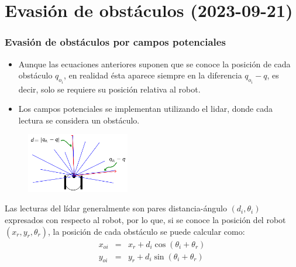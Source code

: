 
\section{Evasión de obstáculos (2023-09-21)}

\begin{frame}\frametitle{Evasión de obstáculos por campos potenciales}
  \begin{itemize}
  \item Aunque las ecuaciones anteriores suponen que se conoce la posición de cada obstáculo $q_{o_i}$, en realidad ésta aparece siempre en la diferencia $q_{o_i} - q$, es decir, solo se requiere su posición relativa al robot.
  \item Los campos potenciales se implementan utilizando el lidar, donde cada lectura se considera un obstáculo. 
  \end{itemize}
  \begin{figure}
    \centering
    \includegraphics[width=0.4\textwidth]{Figures/PotFieldsLidar.png}
  \end{figure}
  Las lecturas del lídar generalmente son pares distancia-ángulo $(d_i,\theta_i)$ expresados con respecto al robot, por lo que, si se conoce la posición del robot $(x_r,y_r,\theta_r)$, la posición de cada obstáculo se puede calcular como:
  \begin{eqnarray*}
    x_{oi} &=& x_r + d_i\cos(\theta_i + \theta_r)\\
    y_{oi} &=& y_r + d_i\sin(\theta_i + \theta_r)\\
  \end{eqnarray*}
\end{frame}

